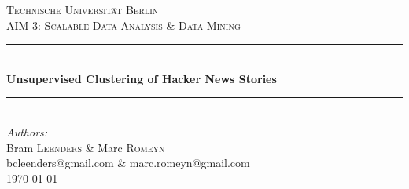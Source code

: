 %
%

\begin{titlepage}

\newcommand{\HRule}{\rule{\linewidth}{0.5mm}} %

\center %
 
\textsc{\LARGE Technische Universit\"at Berlin}\\[1.5cm] %
\textsc{\Large AIM-3: Scalable Data Analysis \& Data Mining}\\[0.5cm] %

\HRule \\[0.4cm]
{ \huge \bfseries Unsupervised Clustering of Hacker News Stories}\\[0.4cm]


\HRule \\[1.5cm]
\Large \emph{Authors:}\\
Bram \textsc{Leenders} \& Marc \textsc{Romeyn}\\
bcleenders@gmail.com \& marc.romeyn@gmail.com\\[3cm]

{\large \today}\\[3cm] 


\vfill %

\end{titlepage}
